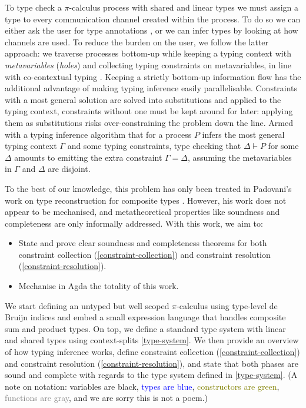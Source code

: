 \documentclass[sigplan,screen,review]{acmart}
\theoremstyle{definition}\newtheorem{mytheorem}{Theorem}[section]
\newcommand{\picalc}{$\pi$-calculus}
\begin{document}
To type check a \picalc{} process with shared and linear types we must assign a type to every communication channel created within the process.
To do so we can either ask the user for type annotations \cite{ZalakainD21}, or we can infer types by looking at how channels are used.
To reduce the burden on the user, we follow the latter approach: we traverse processes bottom-up while keeping a typing context with \emph{metavariables} (\emph{holes}) and collecting typing constraints on metavariables, in line with co-contextual typing \cite{ErdwegBKKM15}.
Keeping a strictly bottom-up information flow has the additional advantage of making typing inference easily parallelisable.
Constraints with a most general solution are solved into substitutions and applied to the typing context, constraints without one must be kept around for later: applying them as substitutions risks over-constraining the problem down the line.
Armed with a typing inference algorithm that for a process $P$ infers the most general typing context $\Gamma$ and some typing constraints, type checking that $\Delta \vdash P$ for some $\Delta$ amounts to emitting the extra constraint $\Gamma = \Delta$, assuming the metavariables in $\Gamma$ and $\Delta$ are disjoint.

To the best of our knowledge, this problem has only been treated in Padovani's work on type reconstruction for composite types \cite{Padovani15}.
However, his work does not appear to be mechanised, and metatheoretical properties like soundness and completeness are only informally addressed.
With this work, we aim to:
\begin{itemize}
  \item State and prove clear soundness and completeness theorems for both constraint collection (\autoref{constraint-collection}) and constraint resolution (\autoref{constraint-resolution}).
  \item Mechanise in Agda the totality of this work.
\end{itemize}

We start defining an untyped but well scoped \picalc{} using type-level de Bruijn indices \cite{deBruijn72} and embed a small expression language that handles composite sum and product types.
On top, we define a standard type system with linear and shared types using context-splits \autoref{type-system}.
We then provide an overview of how typing inference works, define constraint collection (\autoref{constraint-collection}) and constraint resolution (\autoref{constraint-resolution}), and state that both phases are sound and complete with regards to the type system defined in \autoref{type-system}.
(A note on notation: variables are black, \textcolor{blue}{types are blue}, \textcolor{olive}{constructors are green}, \textcolor{gray}{functions are gray}, and we are sorry this is not a poem.)
\end{document}
